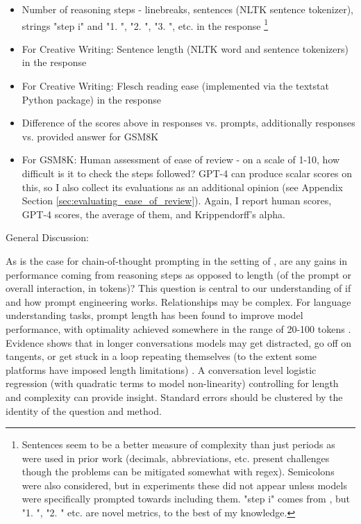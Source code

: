 \documentclass[11pt]{article}
\begin{document}
\begin{itemize}
  \item Number of reasoning steps - linebreaks, sentences (NLTK sentence tokenizer), strings "step i" and "1. ", "2. ", "3. ", etc. in the response \cite{fu_complexity-based_2023} \footnote{Sentences seem to be a better measure of complexity than just periods as were used in prior work (decimals, abbreviations, etc. present challenges though the problems can be mitigated somewhat with regex). Semicolons were also considered, but in experiments these did not appear unless models were specifically prompted towards including them. "step i" comes from \citealp{fu_complexity-based_2023}, but "1. ", "2. " etc. are novel metrics, to the best of my knowledge.}
  \item For Creative Writing: Sentence length (NLTK word and sentence tokenizers) in the response
  \item For Creative Writing: Flesch reading ease (implemented via the textstat Python package) in the response \cite{flesch_how_2016, aggarwal_textstat_nodate}
  \item Difference of the scores above in responses vs. prompts, additionally responses vs. provided answer for GSM8K
  \item For GSM8K: Human assessment of ease of review - on a scale of 1-10, how difficult is it to check the steps followed? GPT-4 can produce scalar scores on this, so I also collect its evaluations as an additional opinion (see Appendix Section \ref{sec:evaluating_ease_of_review}). Again, I report human scores, GPT-4 scores, the average of them, and Krippendorff's alpha.
\end{itemize}

General Discussion:

As is the case for chain-of-thought prompting in the setting of \citealp{fu_complexity-based_2023}, are any gains in performance coming from reasoning steps as opposed to length (of the prompt or overall interaction, in tokens)? This question is central to our understanding of if and how prompt engineering works. Relationships may be complex. For language understanding tasks, prompt length has been found to improve model performance, with optimality achieved somewhere in the range of 20-100 tokens \cite{lester_power_2021}. Evidence shows that in longer conversations models may get distracted, go off on tangents, or get stuck in a loop repeating themselves (to the extent some platforms have imposed length limitations) \cite{shi_large_2023, mann_microsoft_nodate}. A conversation level logistic regression (with quadratic terms to model non-linearity) controlling for length and complexity can provide insight. Standard errors should be clustered by the identity of the question and method.
\end{document}
